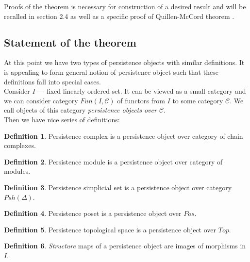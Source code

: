\documentclass[a4paper, 12pt]{article}
\theoremstyle{definition}
\newtheorem{definition}{Definition}
\theoremstyle{remark}
\newcommand{\define}[1]{{\textit{#1}}}
\begin{document}
Proofs of the theorem is necessary for construction of a desired result and will be recalled in section 2.4 as well as a specific proof of Quillen-McCord theorem {\cite[Proof of Theorem 1.1]{Bar11}}.\\

\subsection{Statement of the theorem}

At this point we have two types of persistence objects with similar definitions. It is appealing to form general notion of persistence object such that these definitions fall into special cases.\\

Consider $I$ --- fixed linearly ordered set. It can be viewed as a small category and we can consider category $Fun(I,\mathcal{C})$ of functors from $I$ to some category $\mathcal{C}$. We call objects of this category \define{persistence objects over $\mathcal{C}$}.\\

Then we have nice series of definitions:\\

\begin{definition}
  Persistence complex is a persistence object over category of chain complexes.
\end{definition}

\begin{definition}
  Persistence module is a persistence object over category of modules.
\end{definition}

\begin{definition}
  Persistence simplicial set is a persistence object over category $Psh(\Delta)$.
\end{definition}

\begin{definition}
  Persistence poset is a persistence object over $Pos$.
\end{definition}

\begin{definition}
  Persistence topological space is a persistence object over $Top$.
\end{definition}

\begin{definition}
  \define{Structure} maps of a persistence object are images of morphisms in $I$.
\end{definition}
\end{document}
